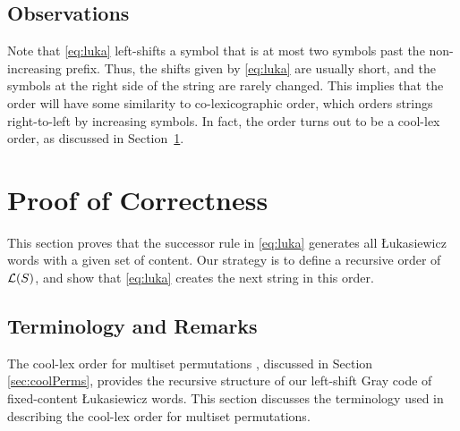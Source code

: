 \subsection{Observations}
\label{sec:prefix_observations}

Note that \eqref{eq:luka} left-shifts a symbol that is at most two symbols past the non-increasing prefix. %
Thus, the shifts given by \eqref{eq:luka} are usually short, and the symbols at the right side of the string are rarely changed.
This implies that the order will have some similarity to co-lexicographic order, which orders strings right-to-left by increasing symbols. 
In fact, the order turns out to be a cool-lex order, as discussed in Section~\ref{sec:lukaproof}.

\section{Proof of Correctness}\label{sec:lukaproof}


This section proves that the successor rule in \eqref{eq:luka} generates all Łukasiewicz words with a given set of content.
Our strategy is to define a recursive order of $\mathcal{L}(S)$, and show that \eqref{eq:luka} creates the next string in this order.

\subsection{Terminology and Remarks}
\label{sec:proof_cool}

The cool-lex order for multiset permutations \cite{CoolSODA}, discussed in Section \ref{sec:coolPerms}, provides the recursive structure of our left-shift Gray code of fixed-content Łukasiewicz words. This section discusses the terminology used in describing the cool-lex order for multiset permutations.

